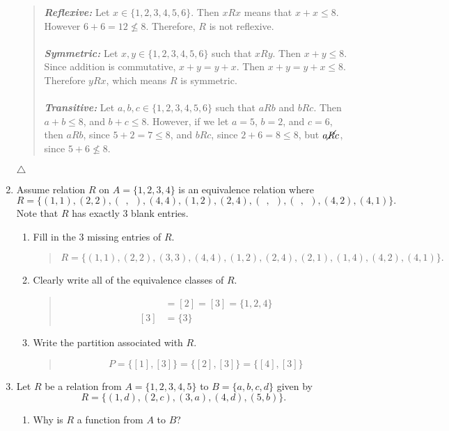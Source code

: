 \documentclass{article}
\begin{document}
\begin{enumerate}
\begin{quote}
\textit{\textbf{Reflexive: }} Let $x \in \{1,2,3,4,5,6\}$. 
Then $xRx$ means that $x + x \leq 8$. 
However $6 + 6 = 12 \nleq 8$. Therefore, $R$ is not reflexive.\\\\
\textit{\textbf{Symmetric: }} Let $x,y \in \{1,2,3,4,5,6\}$ such that $xRy$.
Then $x + y \leq 8$.
Since addition is commutative, $x + y = y + x$.
Then $x + y = y + x \leq 8$.
Therefore $yRx$, which means $R$ is symmetric.\\\\
\textit{\textbf{Transitive: }} Let $a,b,c \in  \{1,2,3,4,5,6\}$ such that $aRb$ and $bRc$.
Then $a + b \leq 8$, and $b + c \leq 8$.
However, if we let $a = 5$, $b = 2$, and $c = 6$, then $aRb$, since $5 + 2 = 7 \leq 8$, and $bRc$,
since $2 + 6 = 8 \leq 8$, but $a\cancel{R}c$, since $5 + 6 \nleq 8$.
\end{quote}
$\triangle$
\item Assume relation $R$ on $A = \{1, 2, 3, 4\}$ is an equivalence relation where 
\[R = \{(1, 1), (2, 2), (\ \ ,\ \ ), (4, 4), (1, 2), (2, 4), (\ \ ,\ \ ), (\ \ ,\ \ ), (4, 2), (4, 1)\}.\]
Note that $R$ has exactly 3 blank entries.
\begin{enumerate}
\item Fill in the 3 missing entries of $R$.
\begin{quote}
\[R = \{(1, 1), (2, 2), (3, 3), (4, 4), (1, 2), (2, 4), (2, 1), (1, 4), (4, 2), (4, 1)\}.\]
\end{quote}
\item Clearly write all of the equivalence classes of $R$.
\begin{quote}
\begin{align*}
[1] &= [2] = [3] = \{1, 2, 4\}\\
[3] &= \{3\}
\end{align*}
\end{quote}
\item Write the partition associated with $R$.
\begin{quote}
\[P = \{[1],[3]\} = \{[2],[3]\} = \{[4],[3]\}\]
\end{quote}
\end{enumerate}
\item  Let $R$ be a relation from $A=\{1,2,3,4,5\}$ to $B=\{a,b,c,d\}$ given by 
\[R=\{(1,d),(2,c),(3,a),(4,d),(5,b)\}.\]
\begin{enumerate}
\item Why is $R$ a function from $A$ to $B$?

\end{enumerate}
\end{enumerate}
\end{document}
